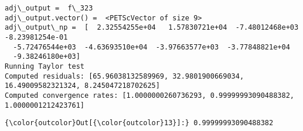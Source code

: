 \documentclass[11pt]{article}
\begin{document}
    \begin{Verbatim}[commandchars=\\\{\}]
adj\_output =  f\_323
adj\_output.vector() =  <PETScVector of size 9>
adj\_output\_np =  [  2.32554255e+04   1.57830721e+04  -7.48012468e+03  -8.23981254e-01
  -5.72476544e+03  -4.63693510e+04  -3.97663577e+03  -3.77848821e+04
  -9.38246180e+03]
Running Taylor test
Computed residuals: [65.96038132589969, 32.9801900669034, 16.49009582321324, 8.245047218702625]
Computed convergence rates: [1.0000000260736293, 0.99999993090488382, 1.0000001212423761]

    \end{Verbatim}

\begin{Verbatim}[commandchars=\\\{\}]
{\color{outcolor}Out[{\color{outcolor}13}]:} 0.99999993090488382
\end{Verbatim}
            

    
    
    
    
\end{document}
